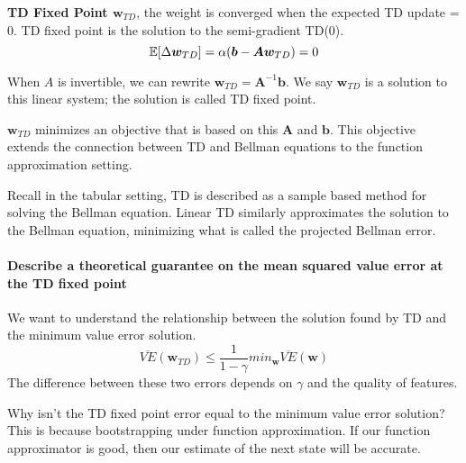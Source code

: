 \documentclass[sutton_barto_notes.tex]{subfiles}
\begin{document}
\begin{definition}
\textbf{TD Fixed Point $\bm{w}_{TD}$}, the weight is converged when the expected TD update = 0. TD fixed point is the solution to the semi-gradient TD(0).
$$\operatorname*{\mathbb{E}}[\Delta \bm{w}_{TD}] = \alpha(\bm{b} - \bm{A}\bm{w}_{TD}) = 0$$
\end{definition}
When $A$ is invertible, we can rewrite $\bm{w}_{TD} = \bm{A}^{-1}\bm{b}$. We say $\bm{w}_{TD}$ is a solution to this linear system; the solution is called TD fixed point.

$\bm{w}_{TD}$ minimizes an objective that is based on this $\bm{A}$ and $\bm{b}$. This objective extends the connection between TD and Bellman equations to the function approximation setting.

Recall in the tabular setting, TD is described as a sample based method for solving the Bellman equation. Linear TD similarly approximates the solution to the Bellman equation, minimizing what is called the projected Bellman error.

\paragraph{Describe a theoretical guarantee on the mean squared value error at the TD fixed point}

We want to understand the relationship between the solution found by TD and the minimum value error solution.
$$\overline{VE}(\bm{w}_{TD}) \leq \frac{1}{1-\gamma}min_{\bm{w}}\overline{VE}(\bm{w})$$
The difference between these two errors depends on $\gamma$ and the quality of features.

Why isn't the TD fixed point error equal to the minimum value error solution? This is because bootstrapping under function approximation. If our function approximator is good, then our estimate of the next state will be accurate.
\end{document}
